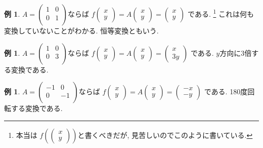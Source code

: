 \documentclass[dvipdfmx,a4paper,11pt]{article}
\theoremstyle{definition}
\newtheorem{exa}[thm]{例}
\begin{document}
 
  \begin{exa}
$
A=\begin{pmatrix}
1& 0 \\
0& 1 \\
\end{pmatrix}
$ならば
$
f\begin{pmatrix}
x \\ y
 \end{pmatrix} 
 =
 A
\begin{pmatrix}
x \\ y
 \end{pmatrix}  = 
 \begin{pmatrix}
x \\y
 \end{pmatrix}
$
である. \footnote{本当は
$f\left(\begin{pmatrix}
x \\ y
 \end{pmatrix} \right)$と書くべきだが, 見苦しいのでこのように書いている.}
これは何も変換していないことがわかる. 恒等変換ともいう. 
\end{exa}
 
   \begin{exa}
$
A=\begin{pmatrix}
1& 0 \\
0& 3 \\
\end{pmatrix}
$ならば
$
f\begin{pmatrix}
x \\ y
 \end{pmatrix} 
 =
 A
\begin{pmatrix}
x \\ y
 \end{pmatrix}  = 
 \begin{pmatrix}
x \\3y
 \end{pmatrix}
$
である. $y$方向に3倍する変換である. 
\end{exa}
 
 \begin{exa}
$
A=\begin{pmatrix}
-1& 0 \\
0& -1 \\
\end{pmatrix}
$ならば
$
f\begin{pmatrix}
x \\ y
 \end{pmatrix} 
 =
 A
\begin{pmatrix}
x \\ y
 \end{pmatrix}  = 
 \begin{pmatrix}
-x \\-y
 \end{pmatrix}
$
である. 180度回転する変換である.
\end{exa}
 
\end{document}
